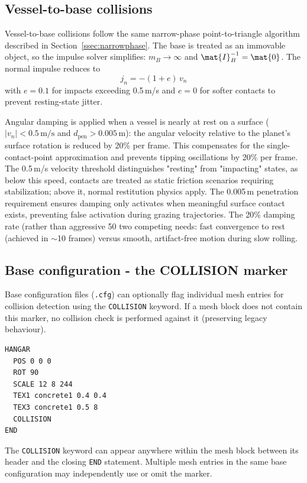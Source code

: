 \documentclass[Orbiter Technical Reference.tex]{subfiles}
\begin{document}
\subsection{Vessel-to-base collisions}
\label{ssec:vessel_base}
Vessel-to-base collisions follow the same narrow-phase point-to-triangle
algorithm described in Section~\ref{ssec:narrowphase}.
The base is treated as an immovable object, so the impulse solver
simplifies: $m_B \to \infty$ and $\mat{I}_B^{-1} = \mat{0}$.
The normal impulse reduces to
\begin{equation*}
j_n = -(1 + e)\,v_n
\end{equation*}
with $e = 0.1$ for impacts exceeding 0.5\,m/s and $e = 0$ for softer
contacts to prevent resting-state jitter.

Angular damping is applied when a vessel is nearly at rest on a surface
($|v_n| < 0.5\,\text{m/s}$ and $d_{\mathrm{pen}} > 0.005\,\text{m}$):
the angular velocity relative to the planet's surface rotation is reduced
by 20\% per frame. This compensates for the single-contact-point
approximation and prevents tipping oscillations by 20\% per frame.
The 0.5\,m/s velocity threshold distinguishes  "resting" from "impacting" states,
as below this speed, contacts are  treated as static friction scenarios requiring stabilization; above it,
normal restitution physics apply. The 0.005\,m penetration requirement
ensures damping only activates when meaningful surface contact exists,
preventing false activation during grazing trajectories. The 20\% 
damping rate (rather than aggressive 50%
two competing needs: fast convergence to rest (achieved in $\sim$10 frames)
versus smooth, artifact-free motion during slow rolling.


\subsection{Base configuration - the COLLISION marker}
\label{ssec:cfg_collision}
Base configuration files (\texttt{.cfg}) can optionally flag individual
mesh entries for collision detection using the \texttt{COLLISION} keyword.
If a mesh block does not contain this marker, no collision check is
performed against it (preserving legacy behaviour).

\begin{lstlisting}[language=OSFS]
HANGAR
  POS 0 0 0
  ROT 90
  SCALE 12 8 244
  TEX1 concrete1 0.4 0.4
  TEX3 concrete1 0.5 8
  COLLISION
END
\end{lstlisting}

The \texttt{COLLISION} keyword can appear anywhere within the mesh block
between its header and the closing \texttt{END} statement.
Multiple mesh entries in the same base configuration may independently
use or omit the marker.
\end{document}
